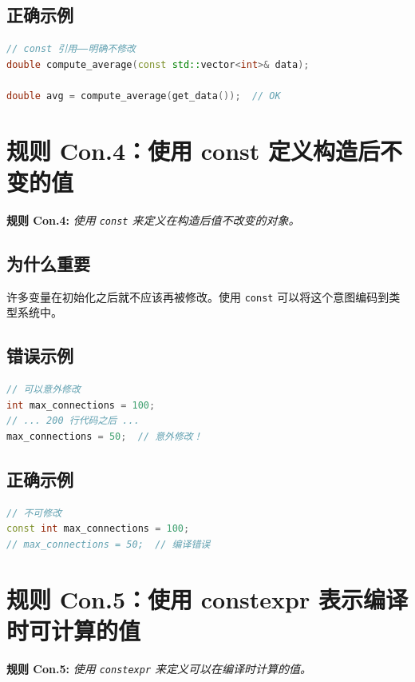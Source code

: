 \subsection{正确示例}

\begin{lstlisting}[language=C++]
// const 引用——明确不修改
double compute_average(const std::vector<int>& data);

double avg = compute_average(get_data());  // OK
\end{lstlisting}

\section{规则 Con.4：使用 const 定义构造后不变的值}

\textbf{规则 Con.4:} \textit{使用 \texttt{const} 来定义在构造后值不改变的对象。}

\subsection{为什么重要}

许多变量在初始化之后就不应该再被修改。使用 \texttt{const} 可以将这个意图编码到类型系统中。

\subsection{错误示例}

\begin{lstlisting}[language=C++]
// 可以意外修改
int max_connections = 100;
// ... 200 行代码之后 ...
max_connections = 50;  // 意外修改！
\end{lstlisting}

\subsection{正确示例}

\begin{lstlisting}[language=C++]
// 不可修改
const int max_connections = 100;
// max_connections = 50;  // 编译错误
\end{lstlisting}

\section{规则 Con.5：使用 constexpr 表示编译时可计算的值}

\textbf{规则 Con.5:} \textit{使用 \texttt{constexpr} 来定义可以在编译时计算的值。}

